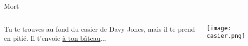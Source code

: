 \documentclass{beamer}
\begin{document}
  \begin{frame}{Mort}
    \hypertarget{mort}{}
    \begin{columns}
        Tu te trouves au fond du casier de Davy Jones, mais il te prend en pitié.
        Il t'envoie \hyperlink{début}{à ton bâteau}...
        \begin{center}
          \texttt{[image: casier.png]}
        \end{center}
    \end{columns}
  \end{frame}
\end{document}
